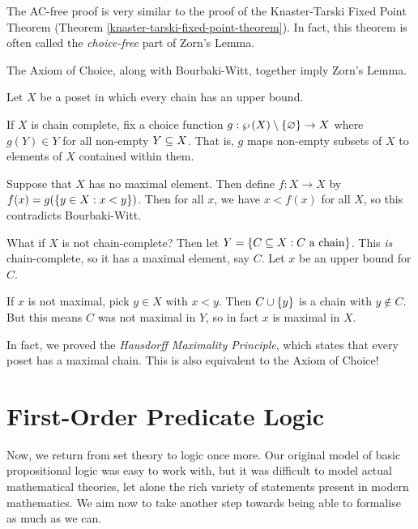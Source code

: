 \documentclass{article}
\begin{document}
\begin{note}
	The AC-free proof is very similar to the proof of the Knaster-Tarski Fixed Point Theorem (Theorem \ref{knaster-tarski-fixed-point-theorem}). In fact, this theorem is often called the \textit{choice-free} part of Zorn's Lemma.
\end{note}

\begin{theorem}[AC + BW $\Ra$ ZL]
    The Axiom of Choice, along with Bourbaki-Witt, together imply Zorn's Lemma.
\end{theorem}

\begin{prf}
    Let $X$ be a poset in which every chain has an upper bound.
    
    If $X$ is chain complete, fix a choice function $g : \wp\left(X\right) \setminus \left\lbrace \varnothing \right\rbrace \to X$ where $g(Y) \in Y$ for all non-empty $Y \subseteq X$. That is, $g$ maps non-empty subsets of $X$ to elements of $X$ contained within them.
    
    Suppose that $X$ has no maximal element. Then define $f : X \to X$ by $f(x) = g(\left\lbrace y \in X : x < y \right\rbrace)$. Then for all $x$, we have $x < f(x)$ for all $X$, so this contradicts Bourbaki-Witt.
    
    What if $X$ is not chain-complete? Then let $Y = \left\lbrace C \subseteq X : C \text{ a chain} \right\rbrace$. This \textit{is} chain-complete, so it has a maximal element, say $C$. Let $x$ be an upper bound for $C$.
    
    If $x$ is not maximal, pick $y \in X$ with $x < y$. Then $C \cup \left\lbrace y \right\rbrace$ is a chain with $y \notin C$. But this means $C$ was not maximal in $Y$, so in fact $x$ is maximal in $X$.
\end{prf}

\begin{note}
	In fact, we proved the \textit{Hausdorff Maximality Principle}, which states that every poset has a maximal chain. This is also equivalent to the Axiom of Choice!
\end{note}


\pagebreak
\section{First-Order Predicate Logic}
\label{section-first-order-predicate-logic}

Now, we return from set theory to logic once more. Our original model of basic propositional logic was easy to work with, but it was difficult to model actual mathematical theories, let alone the rich variety of statements present in modern mathematics. We aim now to take another step towards being able to formalise as much as we can.
\end{document}
